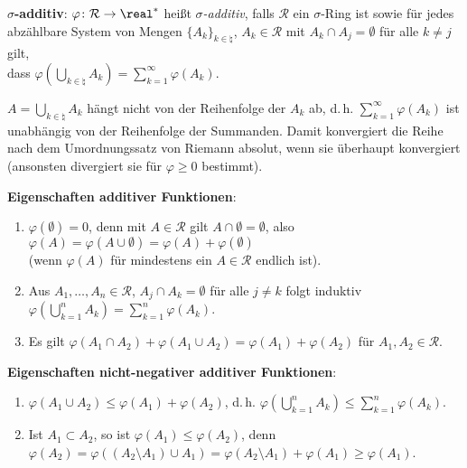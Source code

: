 \textbf{$\sigma$-additiv}:
$\varphi\colon \mathcal{R} \rightarrow \real^\ast$ heißt
\emph{$\sigma$-additiv}, falls $\mathcal{R}$ ein $\sigma$-Ring ist sowie für
jedes abzählbare System von Mengen $\{A_k\}_{k \in \natural}$,
$A_k \in \mathcal{R}$ mit $A_k \cap A_j = \emptyset$
für alle $k \not= j$ gilt, \\
dass $\varphi\left(\bigcup_{k \in \natural} A_k\right) =
\sum_{k=1}^\infty \varphi(A_k)$.

$A = \bigcup_{k \in \natural} A_k$ hängt nicht von der Reihenfolge der $A_k$
ab, d.\,h. $\sum_{k=1}^\infty \varphi(A_k)$ ist unabhängig von der Reihenfolge
der Summanden.
Damit konvergiert die Reihe nach dem Umordnungssatz von Riemann absolut,
wenn sie überhaupt konvergiert (ansonsten divergiert sie für
$\varphi \ge 0$ bestimmt).

\textbf{Eigenschaften additiver Funktionen}:
\begin{enumerate}
    \item
    $\varphi(\emptyset) = 0$, denn mit $A \in \mathcal{R}$ gilt
    $A \cap \emptyset = \emptyset$, also
    $\varphi(A) = \varphi(A \cup \emptyset) =
    \varphi(A) + \varphi(\emptyset)$ \\
    (wenn $\varphi(A)$ für mindestens ein $A \in \mathcal{R}$ endlich ist).
    
    \item
    Aus $A_1, \dotsc, A_n \in \mathcal{R}$, $A_j \cap A_k = \emptyset$ für alle
    $j \not= k$ folgt induktiv 
    $\varphi\left(\bigcup_{k=1}^n A_k\right) = \sum_{k=1}^n \varphi(A_k)$.
    
    \item
    Es gilt $\varphi(A_1 \cap A_2) + \varphi(A_1 \cup A_2) =
    \varphi(A_1) + \varphi(A_2)$ für $A_1, A_2 \in \mathcal{R}$.
\end{enumerate}

\textbf{Eigenschaften nicht-negativer additiver Funktionen}:
\begin{enumerate}[resume]
    \item
    $\varphi(A_1 \cup A_2) \le \varphi(A_1) + \varphi(A_2)$, d.\,h.
    $\varphi\left(\bigcup_{k=1}^n A_k\right) \le \sum_{k=1}^n \varphi(A_k)$.
    
    \item
    Ist $A_1 \subset A_2$, so ist $\varphi(A_1) \le \varphi(A_2)$, denn \\
    $\varphi(A_2) = \varphi((A_2 \setminus A_1) \cup A_1) =
    \varphi(A_2 \setminus A_1) + \varphi(A_1) \ge \varphi(A_1)$.
\end{enumerate}

